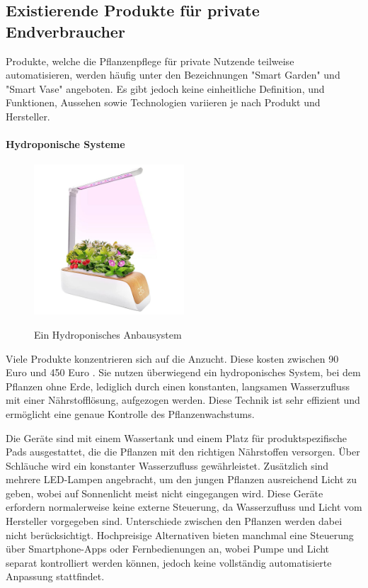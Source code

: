 \subsection{Existierende Produkte für private Endverbraucher}
Produkte, welche die Pflanzenpflege für private Nutzende teilweise automatisieren, werden häufig unter den Bezeichnungen "Smart Garden" und "Smart Vase" angeboten. Es gibt jedoch keine einheitliche Definition, und Funktionen, Aussehen sowie Technologien variieren je nach Produkt und Hersteller. 

\paragraph{Hydroponische Systeme}
\begin{figure}[H]
\centering
\includegraphics[width=0.5\textwidth]{images/hydro.jpg}
\caption{Ein Hydroponisches Anbausystem}\cite{zpyxbh_amazon}
\label{fig:hydro}
\end{figure}

Viele Produkte konzentrieren sich auf die Anzucht. Diese kosten zwischen 90 Euro \textcite{emsa_amazon} und 450 Euro \textcite{geberioz_amazon}. Sie nutzen überwiegend ein hydroponisches System, bei dem Pflanzen ohne Erde, lediglich durch einen konstanten, langsamen Wasserzufluss mit einer Nährstofflösung, aufgezogen werden. Diese Technik ist sehr effizient und ermöglicht eine genaue Kontrolle des Pflanzenwachstums.\textcite{pflanzenfabrik_tropfsystem} 

Die Geräte sind mit einem Wassertank und einem Platz für produktspezifische Pads ausgestattet, die die Pflanzen mit den richtigen Nährstoffen versorgen. Über Schläuche wird ein konstanter Wasserzufluss gewährleistet. Zusätzlich sind mehrere LED-Lampen angebracht, um den jungen Pflanzen ausreichend Licht zu geben, wobei auf Sonnenlicht meist nicht eingegangen wird. Diese Geräte erfordern normalerweise keine externe Steuerung, da Wasserzufluss und Licht vom Hersteller vorgegeben sind. Unterschiede zwischen den Pflanzen werden dabei nicht berücksichtigt. Hochpreisige Alternativen bieten manchmal eine Steuerung über Smartphone-Apps oder Fernbedienungen an, wobei Pumpe und Licht separat kontrolliert werden können, jedoch keine vollständig automatisierte Anpassung stattfindet.

